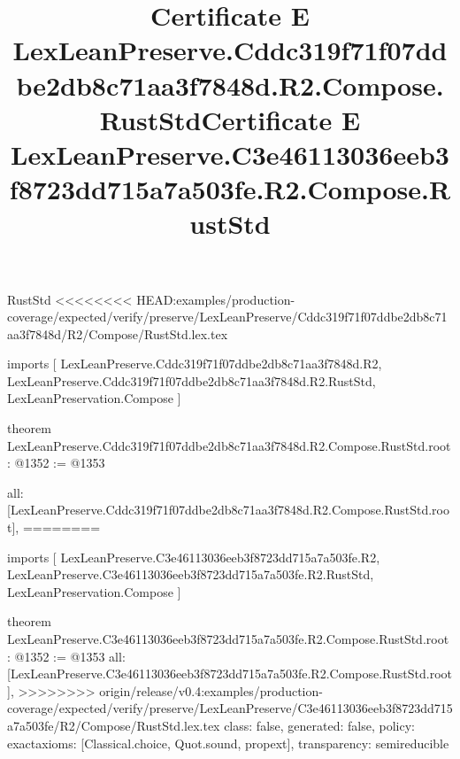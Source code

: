 \begin{lexlean}{RustStd}
<<<<<<<< HEAD:examples/production-coverage/expected/verify/preserve/LexLeanPreserve/Cddc319f71f07ddbe2db8c71aa3f7848d/R2/Compose/RustStd.lex.tex
\title{Certificate E LexLeanPreserve.Cddc319f71f07ddbe2db8c71aa3f7848d.R2.Compose.RustStd}
\begin{coremodule}
imports [
  LexLeanPreserve.Cddc319f71f07ddbe2db8c71aa3f7848d.R2,
  LexLeanPreserve.Cddc319f71f07ddbe2db8c71aa3f7848d.R2.RustStd,
  LexLeanPreservation.Compose
]

theorem LexLeanPreserve.Cddc319f71f07ddbe2db8c71aa3f7848d.R2.Compose.RustStd.root : @1352 := @1353 {
  all: [LexLeanPreserve.Cddc319f71f07ddbe2db8c71aa3f7848d.R2.Compose.RustStd.root],
========
\title{Certificate E LexLeanPreserve.C3e46113036eeb3f8723dd715a7a503fe.R2.Compose.RustStd}
\begin{coremodule}
imports [
  LexLeanPreserve.C3e46113036eeb3f8723dd715a7a503fe.R2,
  LexLeanPreserve.C3e46113036eeb3f8723dd715a7a503fe.R2.RustStd,
  LexLeanPreservation.Compose
]

theorem LexLeanPreserve.C3e46113036eeb3f8723dd715a7a503fe.R2.Compose.RustStd.root : @1352 := @1353 {
  all: [LexLeanPreserve.C3e46113036eeb3f8723dd715a7a503fe.R2.Compose.RustStd.root],
>>>>>>>> origin/release/v0.4:examples/production-coverage/expected/verify/preserve/LexLeanPreserve/C3e46113036eeb3f8723dd715a7a503fe/R2/Compose/RustStd.lex.tex
  class: false,
  generated: false,
  policy: exact{axioms: [Classical.choice, Quot.sound, propext]},
  transparency: semireducible
}


\end{coremodule}}
\end{coremodule}
\end{lexlean}
